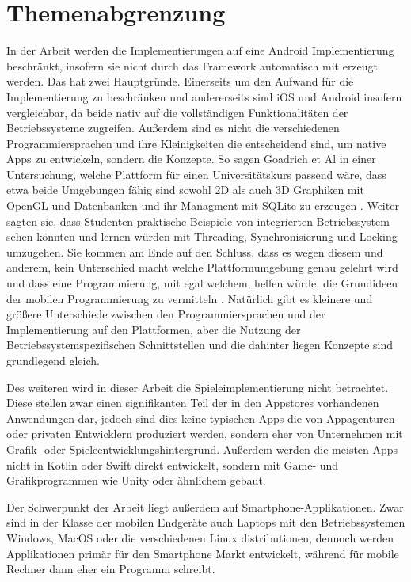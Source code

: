 \section{Themenabgrenzung}
In der Arbeit werden die Implementierungen auf eine Android Implementierung beschränkt, insofern sie nicht durch das Framework automatisch mit erzeugt werden. 
Das hat zwei Hauptgründe. Einerseits um den Aufwand für die Implementierung zu beschränken und andererseits sind iOS und Android insofern vergleichbar, da beide nativ auf die vollständigen Funktionalitäten der Betriebssysteme zugreifen. Außerdem sind es nicht die verschiedenen Programmiersprachen und ihre Kleinigkeiten die entscheidend sind, um native Apps zu entwickeln, sondern die Konzepte. So sagen Goadrich et Al in einer Untersuchung, welche Plattform für einen Universitätskurs passend wäre, dass etwa beide Umgebungen fähig sind sowohl 2D als auch 3D Graphiken mit OpenGL und Datenbanken und ihr Managment mit SQLite zu erzeugen \cite{iOSvsAndroid}. Weiter sagten sie, dass Studenten praktische Beispiele von integrierten Betriebssystem sehen könnten und lernen würden mit Threading, Synchronisierung und Locking umzugehen\cite{iOSvsAndroid}. Sie kommen am Ende auf den Schluss, dass es wegen diesem und anderem, kein Unterschied macht welche Plattformumgebung genau gelehrt wird und dass eine Programmierung, mit egal welchem, helfen würde, die Grundideen der mobilen Programmierung zu vermitteln \cite{iOSvsAndroid}.
Natürlich gibt es kleinere und größere Unterschiede zwischen den Programmiersprachen und der Implementierung auf den Plattformen, aber die Nutzung der Betriebssystemspezifischen Schnittstellen und die dahinter liegen Konzepte sind grundlegend gleich.

Des weiteren wird in dieser Arbeit die Spieleimplementierung nicht betrachtet. Diese stellen zwar einen signifikanten Teil der in den Appstores vorhandenen Anwendungen dar, jedoch sind dies keine typischen Apps die von Appagenturen oder privaten Entwicklern produziert werden, sondern eher von Unternehmen mit Grafik- oder Spieleentwicklungshintergrund. Außerdem werden die meisten Apps nicht in Kotlin oder Swift direkt entwickelt, sondern mit Game- und Grafikprogrammen wie Unity oder ähnlichem gebaut. 

Der Schwerpunkt der Arbeit liegt außerdem auf Smartphone-Applikationen. Zwar sind in der Klasse der mobilen Endgeräte auch Laptops mit den Betriebssystemen Windows, MacOS oder die verschiedenen Linux distributionen, dennoch werden Applikationen primär für den Smartphone Markt entwickelt, während für mobile Rechner dann eher ein Programm schreibt.

